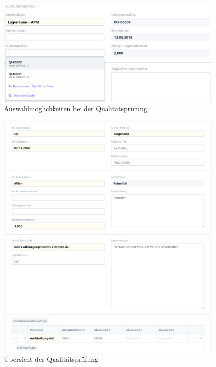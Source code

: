 \begin{figure}[H]
  \centering
  \includegraphics[width=\textwidth]{Bilder/Qualitaetskontrolle_auswaehlen.PNG}
  \caption{Auswahlmöglichkeiten bei der Qualitätsprüfung}
  \label{fig:auswQual}
\end{figure}
\begin{figure}[H]
  \centering
  \includegraphics[width=\textwidth]{Bilder/Qualitaetspruefung.PNG}
  \caption{Übersicht der Qualitätsprüfung}
  \label{fig:qualPruef}
\end{figure}
